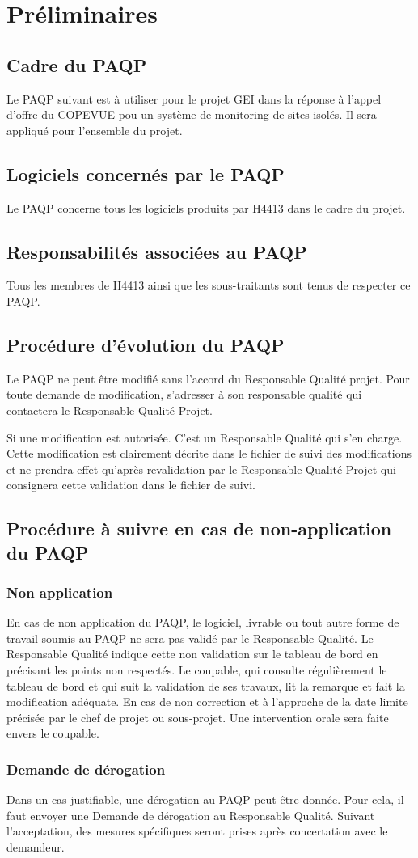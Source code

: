 
\section{Préliminaires}
    \subsection{Cadre du PAQP}
    Le PAQP suivant est à utiliser pour le projet GEI dans la réponse à l'appel 
d'offre du COPEVUE pou un système de monitoring de sites isolés.
Il sera appliqué pour l'ensemble du projet.
    \subsection{Logiciels concernés par le PAQP}
    Le PAQP concerne tous les logiciels produits par H4413 dans le cadre du
projet.
    \subsection{Responsabilités associées au PAQP}
    Tous les membres de H4413 ainsi que les sous-traitants sont tenus de
respecter ce PAQP.
    \subsection{Procédure d'évolution du PAQP}
    Le PAQP ne peut être modifié sans l'accord du Responsable Qualité projet.
    Pour toute demande de modification, s'adresser à son responsable qualité qui 
contactera le Responsable Qualité Projet.
    
    Si une modification est autorisée. C'est un Responsable Qualité qui s'en charge.
    Cette modification est clairement décrite dans le fichier de suivi des 
modifications et ne prendra effet qu'après revalidation par le Responsable 
Qualité Projet qui consignera cette validation dans le fichier de suivi.
    \subsection{Procédure à  suivre en cas de non-application du PAQP}
    \subsubsection{Non application}

    En cas de non application du PAQP, le logiciel, livrable ou tout autre forme 
de travail soumis au PAQP ne sera pas validé par le Responsable Qualité.
    Le Responsable Qualité indique cette non validation sur le tableau de bord 
en précisant les points non respectés.
    Le coupable, qui consulte régulièrement le tableau de bord et qui suit la 
validation de ses travaux, lit la remarque et fait la modification adéquate.
    En cas de non correction et à l'approche de la date limite précisée par le 
chef de projet ou sous-projet. Une intervention orale sera faite envers le 
coupable.

    \subsubsection{Demande de dérogation}

    Dans un cas justifiable, une dérogation au PAQP peut être donnée. Pour cela,
il faut envoyer une Demande de dérogation au Responsable Qualité.
    Suivant l'acceptation, des mesures spécifiques seront prises après 
concertation avec le demandeur.
